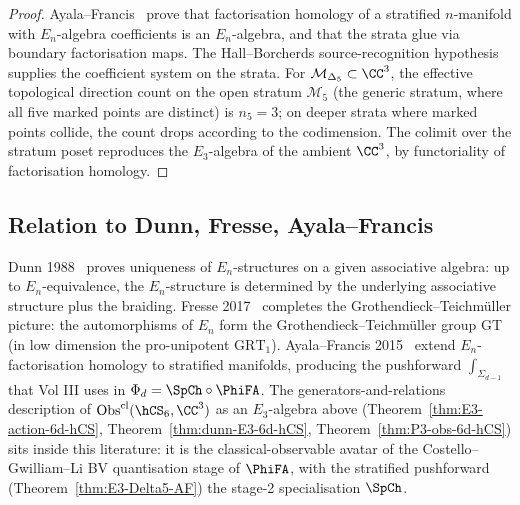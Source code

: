\begin{proof}
Ayala--Francis~\cite{AF15} prove that factorisation homology of a
stratified $n$-manifold with $E_n$-algebra coefficients is an
$E_n$-algebra, and that the strata glue via boundary factorisation
maps. The Hall--Borcherds source-recognition hypothesis supplies the
coefficient system on the strata. For
$\mathcal{M}_{\Delta_5}\subset \CC^3$, the effective
topological direction count on the open stratum $\mathcal{M}_5$ (the
generic stratum, where all five marked points are distinct) is $n_5
= 3$; on deeper strata where marked points collide, the count drops
according to the codimension. The colimit over the stratum poset
reproduces the $E_3$-algebra of the ambient $\CC^3$, by functoriality
of factorisation homology.
\end{proof}

\subsection{Relation to Dunn, Fresse, Ayala--Francis}
\label{subsec:E3-literature}

\begin{remark}
\label{rem:E3-literature-position}
Dunn 1988~\cite{Dunn88} proves uniqueness of $E_n$-structures on a
given associative algebra: up to $E_n$-equivalence, the
$E_n$-structure is determined by the underlying associative
structure plus the braiding. Fresse 2017~\cite{fresse-book}
completes the Grothendieck--Teichm\"uller picture: the
automorphisms of $E_n$ form the Grothendieck--Teichm\"uller group
$\mathrm{GT}$ (in low dimension the pro-unipotent $\mathrm{GRT}_1$).
Ayala--Francis 2015~\cite{AF15} extend $E_n$-factorisation homology
to stratified manifolds, producing the pushforward
$\int_{\Sigma_{d-1}}$ that Vol III uses in
$\Phi_d = \SpCh\circ\PhiFA$. The generators-and-relations
description of $\mathrm{Obs}^{\mathrm{cl}}(\hCS_6,\CC^3)$ as an
$E_3$-algebra above (Theorem~\ref{thm:E3-action-6d-hCS},
Theorem~\ref{thm:dunn-E3-6d-hCS}, Theorem~\ref{thm:P3-obs-6d-hCS})
sits inside this literature: it is the classical-observable avatar
of the Costello--Gwilliam--Li BV quantisation stage of
$\PhiFA$, with the stratified pushforward
(Theorem~\ref{thm:E3-Delta5-AF}) the stage-2 specialisation
$\SpCh$.
\end{remark}
